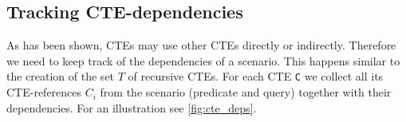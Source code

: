 
\subsection{Tracking CTE-dependencies}\label{tracking_cte_dependencies}
As has been shown, CTEs may use other CTEs directly or indirectly. Therefore we need to keep track of the dependencies of a scenario. This happens similar to the creation of the set $T$ of recursive CTEs. For each CTE \texttt{C} we collect all its CTE-references \texttt{$C_i$} from the scenario (predicate and query) together with their dependencies. For an illustration see \autoref{fig:cte_deps}.

